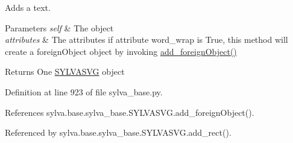 Adds a text. 


\begin{DoxyParams}{Parameters}
{\em self} & The object \\
\hline
{\em attributes} & The attributes if attribute \textquotesingle{}word\+\_\+wrap\textquotesingle{} is True, this method will create a {\ttfamily foreign\+Object} object by invoking \hyperlink{classsylva_1_1base_1_1sylva__base_1_1_s_y_l_v_a_s_v_g_acc461814ddb36c877415dde5ba29d49b}{add\+\_\+foreign\+Object()}\\
\hline
\end{DoxyParams}
\begin{DoxyReturn}{Returns}
One \hyperlink{classsylva_1_1base_1_1sylva__base_1_1_s_y_l_v_a_s_v_g}{S\+Y\+L\+V\+A\+S\+VG} object 
\end{DoxyReturn}


Definition at line 923 of file sylva\+\_\+base.\+py.



References sylva.\+base.\+sylva\+\_\+base.\+S\+Y\+L\+V\+A\+S\+V\+G.\+add\+\_\+foreign\+Object().



Referenced by sylva.\+base.\+sylva\+\_\+base.\+S\+Y\+L\+V\+A\+S\+V\+G.\+add\+\_\+rect().


